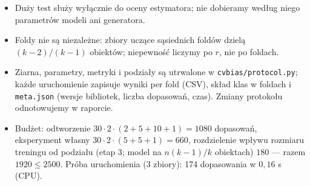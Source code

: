\documentclass[10pt,a4paper]{article}
\newcommand{\hd}[1]{\par\vspace{0.55em}{\normalsize\bfseries #1}\par\vspace{0.1em}}
\begin{document}
\hd{6. Kontrola poprawności i budżet}
\begin{itemize}
  \item Duży test służy wyłącznie do oceny estymatora; nie dobieramy według niego parametrów modeli ani generatora.
  \item Foldy nie są niezależne: zbiory uczące sąsiednich foldów dzielą $(k-2)/(k-1)$ obiektów; niepewność liczymy po $r$, nie po foldach.
  \item Ziarna, parametry, metryki i podziały są utrwalone w \texttt{cvbias/protocol.py}; każde uruchomienie zapisuje wyniki per fold
    (CSV), skład klas w foldach i \texttt{meta.json} (wersje bibliotek, liczba dopasowań, czas). Zmiany protokołu odnotowujemy w raporcie.
  \item Budżet: odtworzenie $30\cdot2\cdot(2+5+10+1)=1080$ dopasowań, eksperyment własny $30\cdot2\cdot(5+5+1)=660$,
    rozdzielenie wpływu rozmiaru treningu od podziału (etap 3; model na $n(k-1)/k$ obiektach) $180$ --- razem $1920\le2500$.
    Próba uruchomienia (3 zbiory): 174 dopasowania w $0{,}16$ s (CPU).
\end{itemize}
\end{document}

